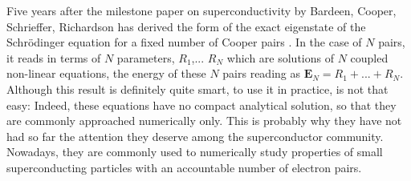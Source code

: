 \documentclass[aps,prb,superscriptaddress,twocolumn]{revtex4}
\begin{document}
Five years after the milestone paper on superconductivity by Bardeen,
Cooper, Schrieffer\cite{BCS}, Richardson has derived the form of the exact
eigenstate of the Schr\"{o}dinger equation for a fixed number of Cooper pairs%
\cite{Richardson1,Richardson2}. In the case of $N$ pairs, it reads in terms
of $N$ parameters, $R_{1}$,... $R_{N}$ which are solutions of $N$ coupled
non-linear equations, the energy of these $N$ pairs reading as $\mathbf{E}%
_{N}=R_{1}+...+R_{N}$. Although this result is definitely quite smart, to
use it in practice, is not that easy: Indeed, these equations have no
compact analytical solution, so that they are commonly approached
numerically only. This is probably why they have not had so far the
attention they deserve among the superconductor community. Nowadays, they
are commonly used to numerically study properties of small superconducting
particles with an accountable number of electron pairs.
\end{document}
